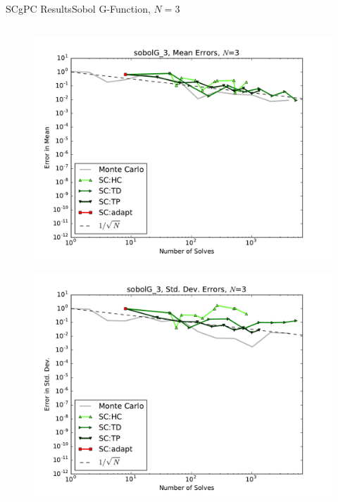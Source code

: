 \documentclass{beamer}
\begin{document}
\begin{frame}{SCgPC Results}{Sobol G-Function, $N=3$}
\begin{columns}
\begin{column}{0.5\textwidth}
\begin{figure}[h!]
          \includegraphics[width=0.8\linewidth]{anlmodels/sobolG_3_mean_errs_nohdmr}
        \end{figure}
        \vspace{-20pt}
        \begin{figure}[h!]
          \centering
          \includegraphics[width=0.8\linewidth]{anlmodels/sobolG_3_variance_errs_nohdmr}
        \end{figure}
   \end{column}
 \end{columns}
\end{frame}
\end{document}
